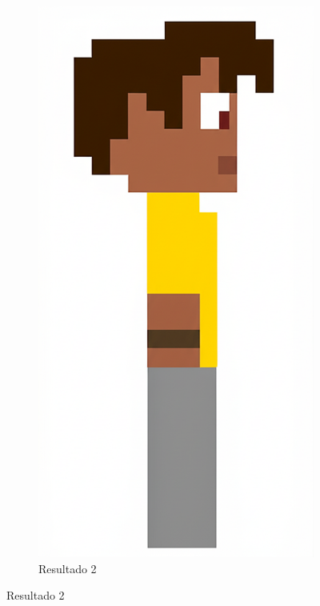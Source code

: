\begin{figure}[htbp]
\begin{subfigure}{0.3\linewidth}
        \includegraphics[width=1\linewidth]{figs/geminiPro/chat2/res2_tela1.png}
        \caption{\small Resultado 2}
        \label{fig:geminiPro4b}
    \end{subfigure}
\end{figure}

